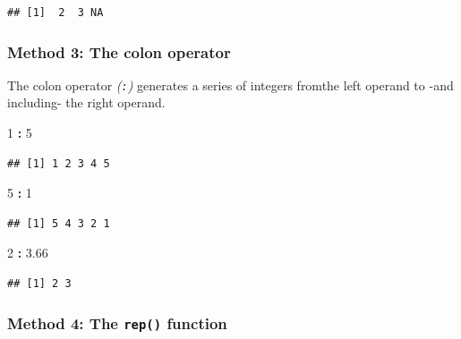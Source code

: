 \documentclass[]{book}
\newenvironment{Shaded}{\begin{snugshade}}{\end{snugshade}}
\newcommand{\DecValTok}[1]{\textcolor[rgb]{0.00,0.00,0.81}{#1}}
\newcommand{\FloatTok}[1]{\textcolor[rgb]{0.00,0.00,0.81}{#1}}
\newcommand{\OperatorTok}[1]{\textcolor[rgb]{0.81,0.36,0.00}{\textbf{#1}}}
\newcommand{\StringTok}[1]{\textcolor[rgb]{0.31,0.60,0.02}{#1}}
\begin{document}
\begin{verbatim}
## [1]  2  3 NA
\end{verbatim}

\hypertarget{method-3-the-colon-operator}{%
\subsubsection*{Method 3: The colon operator}\label{method-3-the-colon-operator}}

The colon operator \emph{(\texttt{:})} generates a series of integers fromthe left operand to -and including- the right operand.

\begin{Shaded}
\begin{Highlighting}[]
\DecValTok{1} \OperatorTok{:}\StringTok{ }\DecValTok{5}
\end{Highlighting}
\end{Shaded}

\begin{verbatim}
## [1] 1 2 3 4 5
\end{verbatim}

\begin{Shaded}
\begin{Highlighting}[]
\DecValTok{5} \OperatorTok{:}\StringTok{ }\DecValTok{1}
\end{Highlighting}
\end{Shaded}

\begin{verbatim}
## [1] 5 4 3 2 1
\end{verbatim}

\begin{Shaded}
\begin{Highlighting}[]
\DecValTok{2} \OperatorTok{:}\StringTok{ }\FloatTok{3.66}
\end{Highlighting}
\end{Shaded}

\begin{verbatim}
## [1] 2 3
\end{verbatim}

\hypertarget{method-4-the-rep-function}{%
\subsubsection*{\texorpdfstring{Method 4: The \texttt{rep()} function}{Method 4: The rep() function}}\label{method-4-the-rep-function}}
\end{document}
